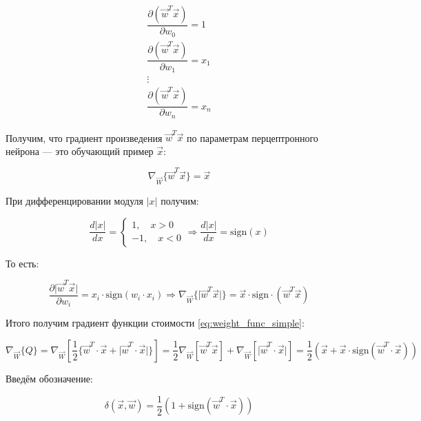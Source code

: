 \documentclass{article}
\numberwithin{equation}{subsection}
\begin{document}
\begin{align*}
    \dfrac{\partial \left( \vec{w}^T \vec{x} \right)}{\partial w_0} = 1 \\
    \dfrac{\partial \left( \vec{w}^T \vec{x} \right)}{\partial w_1} = x_1 \\
    \vdots \\
    \dfrac{\partial \left( \vec{w}^T \vec{x} \right)}{\partial w_n} = x_n
\end{align*}

Получим, что градиент произведения $\vec{w}^T \vec{x}$ по параметрам перцептронного
нейрона --- это обучающий пример $\vec{x}$:

\begin{equation}
    \nabla_{\vec{W}} \{\vec{w}^T \vec{x} \} = \vec{x}
\end{equation}

При дифференцировании модуля $\lvert x \rvert$ получим:

\begin{equation}
    \dfrac{d\lvert x \rvert}{dx} =
    \begin{cases}
        1, \quad x>0 \\
        -1, \quad x<0
    \end{cases}
    \Rightarrow \dfrac{d\lvert x \rvert}{dx} = \mathrm{sign} (x)
\end{equation}

То есть:

\begin{equation}
    \dfrac{\partial \lvert \vec{w}^T \vec{x} \rvert}{\partial w_i} = x_i \cdot \mathrm{sign} (w_i \cdot x_i)
    \Rightarrow \nabla_{\vec{W}} \{\lvert \vec{w}^T \vec{x} \rvert\} = \vec{x} \cdot \mathrm{sign} \cdot (\vec{w}^T \vec{x})
\end{equation}

Итого получим градиент функции стоимости \ref{eq:weight_func_simple}:

\begin{equation}
    \nabla_{\vec{W}} \{Q\} = \nabla_{\vec{W}} \left[\dfrac{1}{2} \{ \vec{w}^T \cdot \vec{x} + 
    \lvert \vec{w}^T \cdot \vec{x}  \rvert \} \right] 
    = \dfrac{1}{2}  \nabla_{\vec{W}} \left[ \vec{w}^T \vec{x} \right] + 
    \nabla_{\vec{W}} \left[ \lvert \vec{w}^T \cdot \vec{x}  \rvert \right]
    = \dfrac{1}{2} \left(\vec{x} + \vec{x} \cdot \mathrm{sign} (\vec{w}^T \cdot \vec{x})\right)
\end{equation}

Введём обозначение:

\begin{equation}
    \delta (\vec{x}, \vec{w}) = \dfrac{1}{2} \left( 1 + \mathrm{sign} (\vec{w}^T \cdot \vec{x}) \right)
\end{equation}
\end{document}
